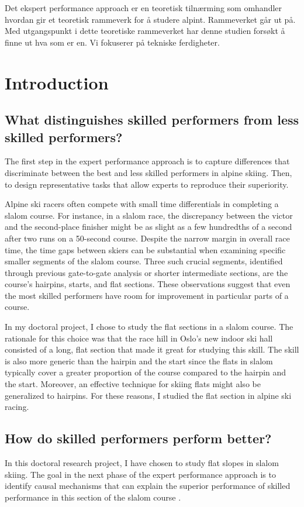 \documentclass[letterpaper,10pt]{article}
\begin{document}
Det ekspert performance approach er en teoretisk tilnærming som omhandler hvordan gir et teoretisk rammeverk for å studere alpint. Rammeverket går ut på. Med utgangspunkt i dette teoretiske rammeverket har denne studien forsøkt å finne ut hva som er en. Vi fokuserer på tekniske ferdigheter.

\section{Introduction}


\subsection{What distinguishes skilled performers from less skilled performers?}

The first step in the expert performance approach is to capture differences that discriminate between the best and less skilled performers in alpine skiing. Then, to design representative tasks that allow experts to reproduce their superiority.

Alpine ski racers often compete with small time differentials in completing a slalom course. For instance, in a slalom race, the discrepancy between the victor and the second-place finisher might be as slight as a few hundredths of a second after two runs on a 50-second course. Despite the narrow margin in overall race time, the time gaps between skiers can be substantial when examining specific smaller segments of the slalom course. Three such crucial segments, identified through previous gate-to-gate analysis or shorter intermediate sections, are the course's hairpins, starts, and flat sections. These observations suggest that even the most skilled performers have room for improvement in particular parts of a course.

In my doctoral project, I chose to study the flat sections in a slalom course. The rationale for this choice was that the race hill in Oslo's new indoor ski hall consisted of a long, flat section that made it great for studying this skill. The skill is also more generic than the hairpin and the start since the flats in slalom typically cover a greater proportion of the course compared to the hairpin and the start. Moreover, an effective technique for skiing flats might also be generalized to hairpins. For these reasons, I studied the flat section in alpine ski racing. 


\subsection{How do skilled performers perform better?}
In this doctoral research project, I have chosen to study flat slopes in slalom skiing. The goal in the next phase of the expert performance approach is to identify causal mechanisms that can explain the superior performance of skilled performance in this section of the slalom course \cite{williams_using_2017}. 
\end{document}
